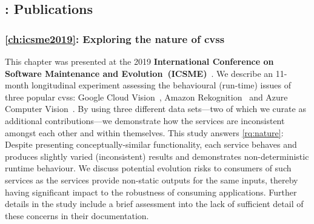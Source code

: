 \subsection{: Publications}

\subsubsection{\cref{ch:icsme2019}: Exploring the nature of \glspl{cvs}} This chapter was presented at the 2019 \textbf{International Conference on Software Maintenance and Evolution~(ICSME)}~\citep{Cummaudo:2019icsme}. We describe an 11-month longitudinal experiment assessing the behavioural (run-time) issues of three popular \glspl{cvs}: Google Cloud Vision~, Amazon Rekognition~ and Azure Computer Vision~. By using three different data sets---two of which we curate as additional contributions---we demonstrate how the services are inconsistent amongst each other and within themselves. This study answers \ref{rq:nature}: Despite presenting conceptually-similar functionality, each service behaves and produces slightly varied (inconsistent) results and demonstrates non-deterministic runtime behaviour. We discuss potential evolution risks to consumers of such services as the services provide non-static outputs for the same inputs, thereby having significant impact to the robustness of consuming applications. Further details in the study include a brief assessment into the lack of sufficient detail of these concerns in their documentation.

